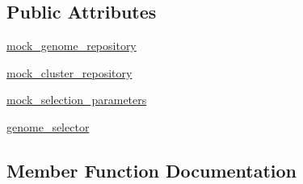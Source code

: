 \subsection*{Public Attributes}
\begin{DoxyCompactItemize}
\item 
\hyperlink{classNEAT__PyGenetics_1_1NEAT_1_1Tests_1_1AnalystTests_1_1test__genomeSelector_1_1test__genomeSelector_af28f36e08d36b7693e8d181ee8143751}{mock\+\_\+genome\+\_\+repository}
\item 
\hyperlink{classNEAT__PyGenetics_1_1NEAT_1_1Tests_1_1AnalystTests_1_1test__genomeSelector_1_1test__genomeSelector_a54e3883498756f3e673b2eebc77890cb}{mock\+\_\+cluster\+\_\+repository}
\item 
\hyperlink{classNEAT__PyGenetics_1_1NEAT_1_1Tests_1_1AnalystTests_1_1test__genomeSelector_1_1test__genomeSelector_ac77001932f6d9ab981a690257f7ff5d1}{mock\+\_\+selection\+\_\+parameters}
\item 
\hyperlink{classNEAT__PyGenetics_1_1NEAT_1_1Tests_1_1AnalystTests_1_1test__genomeSelector_1_1test__genomeSelector_a824c9616385543a8e9fe05a641932676}{genome\+\_\+selector}
\end{DoxyCompactItemize}


\subsection{Member Function Documentation}
